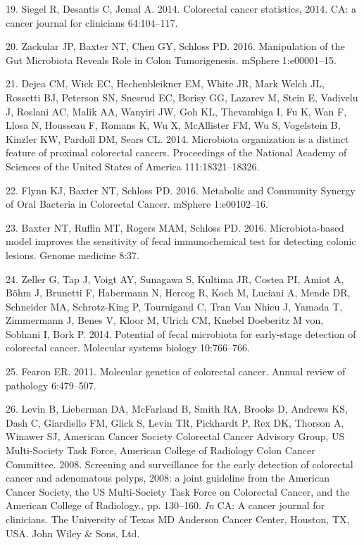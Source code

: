 \documentclass[12pt,]{article}
\begin{document}
\hypertarget{ref-Siegel:2014jo}{}
19. Siegel R, Desantis C, Jemal A. 2014. Colorectal cancer statistics,
2014. CA: a cancer journal for clinicians 64:104--117.

\hypertarget{ref-Zackular:2016en}{}
20. Zackular JP, Baxter NT, Chen GY, Schloss PD. 2016. Manipulation of
the Gut Microbiota Reveals Role in Colon Tumorigenesis. mSphere
1:e00001--15.

\hypertarget{ref-Dejea:2014fz}{}
21. Dejea CM, Wick EC, Hechenbleikner EM, White JR, Mark Welch JL,
Rossetti BJ, Peterson SN, Snesrud EC, Borisy GG, Lazarev M, Stein E,
Vadivelu J, Roslani AC, Malik AA, Wanyiri JW, Goh KL, Thevambiga I, Fu
K, Wan F, Llosa N, Housseau F, Romans K, Wu X, McAllister FM, Wu S,
Vogelstein B, Kinzler KW, Pardoll DM, Sears CL. 2014. Microbiota
organization is a distinct feature of proximal colorectal cancers.
Proceedings of the National Academy of Sciences of the United States of
America 111:18321--18326.

\hypertarget{ref-Flynn:2016iu}{}
22. Flynn KJ, Baxter NT, Schloss PD. 2016. Metabolic and Community
Synergy of Oral Bacteria in Colorectal Cancer. mSphere 1:e00102--16.

\hypertarget{ref-Baxter:2016dja}{}
23. Baxter NT, Ruffin MT, Rogers MAM, Schloss PD. 2016. Microbiota-based
model improves the sensitivity of fecal immunochemical test for
detecting colonic lesions. Genome medicine 8:37.

\hypertarget{ref-Zeller:2014ix}{}
24. Zeller G, Tap J, Voigt AY, Sunagawa S, Kultima JR, Costea PI, Amiot
A, Böhm J, Brunetti F, Habermann N, Hercog R, Koch M, Luciani A, Mende
DR, Schneider MA, Schrotz-King P, Tournigand C, Tran Van Nhieu J, Yamada
T, Zimmermann J, Benes V, Kloor M, Ulrich CM, Knebel Doeberitz M von,
Sobhani I, Bork P. 2014. Potential of fecal microbiota for early-stage
detection of colorectal cancer. Molecular systems biology 10:766--766.

\hypertarget{ref-Fearon:2011go}{}
25. Fearon ER. 2011. Molecular genetics of colorectal cancer. Annual
review of pathology 6:479--507.

\hypertarget{ref-Levin:2008kz}{}
26. Levin B, Lieberman DA, McFarland B, Smith RA, Brooks D, Andrews KS,
Dash C, Giardiello FM, Glick S, Levin TR, Pickhardt P, Rex DK, Thorson
A, Winawer SJ, American Cancer Society Colorectal Cancer Advisory Group,
US Multi-Society Task Force, American College of Radiology Colon Cancer
Committee. 2008. Screening and surveillance for the early detection of
colorectal cancer and adenomatous polyps, 2008: a joint guideline from
the American Cancer Society, the US Multi-Society Task Force on
Colorectal Cancer, and the American College of Radiology., pp. 130--160.
\emph{In} CA: A cancer journal for clinicians. The University of Texas
MD Anderson Cancer Center, Houston, TX, USA. John Wiley \& Sons, Ltd.
\end{document}
